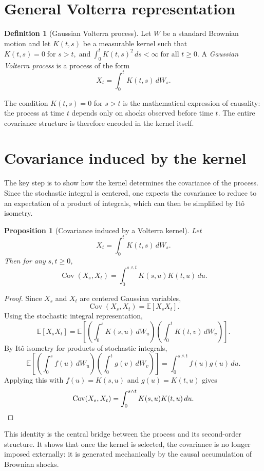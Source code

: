 \documentclass[a4paper,10pt,titlepage,oneside,openany]{book}
\theoremstyle{plain}
\newtheorem{proposition}{Proposition}[chapter]
\theoremstyle{definition}
\newtheorem{definition}{Definition}[chapter]
\theoremstyle{remark}
\newcommand{\E}{\mathbb{E}}
\newcommand{\Cov}{\operatorname{Cov}}
\newcommand{\1}{\mathbf{1}}
\begin{document}
\section{General Volterra representation}

\begin{definition}[Gaussian Volterra process]
Let \(W\) be a standard Brownian motion and let \(K(t,s)\) be a measurable kernel such that
\(
K(t,s)=0 \; \text{for } s>t,
\; \text{and}  \;
\int_0^t K(t,s)^2\,ds<\infty
\; \text{for all } t\ge 0.
\)
A \emph{Gaussian Volterra process} is a process of the form
\[
X_t=\int_0^t K(t,s)\,dW_s.
\]
\end{definition}

The condition \(K(t,s)=0\) for \(s>t\) is the mathematical expression of causality: the process at time \(t\) depends only on shocks observed before time \(t\). The entire covariance structure is therefore encoded in the kernel itself.

\section{Covariance induced by the kernel}

The key step is to show how the kernel determines the covariance of the process. Since the stochastic integral is centered, one expects the covariance to reduce to an expectation of a product of integrals, which can then be simplified by It\^o isometry.

\begin{proposition}[Covariance induced by a Volterra kernel]
Let
\[
X_t=\int_0^t K(t,s)\,dW_s.
\]
Then for any \(s,t\ge 0\),
\[
\Cov(X_s,X_t)
=
\int_0^{s\wedge t} K(s,u)K(t,u)\,du.
\]
\end{proposition}

\begin{proof}
Since \(X_s\) and \(X_t\) are centered Gaussian variables,
\[
\Cov(X_s,X_t)=\E[X_sX_t].
\]
Using the stochastic integral representation,
\[
\E[X_sX_t]
=
\E\!\left[
\left(\int_0^s K(s,u)\,dW_u\right)
\left(\int_0^t K(t,v)\,dW_v\right)
\right].
\]
By It\^o isometry for products of stochastic integrals,
\[
\E\!\left[
\left(\int_0^s f(u)\,dW_u\right)
\left(\int_0^t g(v)\,dW_v\right)
\right]
=
\int_0^{s\wedge t} f(u)g(u)\,du.
\]
Applying this with \(f(u)=K(s,u)\) and \(g(u)=K(t,u)\) gives
\[
\Cov(X_s,X_t)
=
\int_0^{s\wedge t} K(s,u)K(t,u)\,du. \qedhere
\]
\end{proof}
    
This identity is the central bridge between the process and its second-order structure. It shows that once the kernel is selected, the covariance is no longer imposed externally: it is generated mechanically by the causal accumulation of Brownian shocks.
\end{document}
